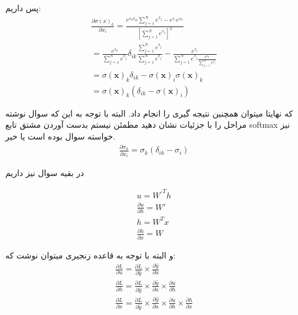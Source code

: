 \documentclass{article}[12pt]
\begin{document}
پس داریم:
\begin{gather*}
		\frac{\partial \sigma(x)_{k}}{\partial x_{i}}=\frac{e^{x_{k} \delta_{i k}} \sum_{j=1}^{N} e^{x_{j}}-e^{x_{i}} e^{x_{k}}}{\left[\sum_{j=1}^{N} e^{x_{j}}\right]^{2}} \\
		=\frac{e^{x_{k}}}{\sum_{j=1}^{N} e^{x_{j}}} \delta_{i k} \frac{\sum_{j=1}^{N} e^{x_{j}}}{\sum_{j=1}^{N} e^{x_{j}}}-\frac{e^{x_{i}}}{\sum_{j=1}^{N} e^{x_{j}} \frac{e^{x_{k}}}{\sum_{j=1}^{N} e^{x_{j}}}} \\
		=\sigma(\mathbf{x})_{k} \delta_{i k}-\sigma(\mathbf{x})_{i} \sigma(\mathbf{x})_{k} \\
		=\sigma(\mathbf{x})_{k}\left(\delta_{i k}-\sigma(\mathbf{x})_{i}\right)
\end{gather*}

که نهایتا میتوان همچنین نتیجه گیری را انجام داد. البته با توجه به این که سوال نوشته مراحل را با جزئیات نشان دهید مطمئن نیستم بدست آوردن مشتق تابع softmax نیز خواسته سوال بوده است یا خیر. 
\begin{gather*}
	\frac{\partial \sigma_{k}}{\partial x_{i}}=\sigma_{k}\left(\delta_{i k}-\sigma_{i}\right)
\end{gather*}

در بقیه سوال نیز داریم 

$$ \begin{array}{l}
	u=W{^{\prime }}^{T} h\\
	\frac{\partial u}{\partial h} =W'\\
	h=W^{T} x\\
	\frac{\partial h}{\partial x} =W
\end{array}
$$

و البته با توجه به قاعده زنجیری میتوان نوشت که: 
\begin{gather*}
	\frac{\partial L}{\partial u} =\frac{\partial L}{\partial \hat{y}} \times \frac{\partial \hat{y}}{\partial u}\\
	\frac{\partial L}{\partial h} =\frac{\partial L}{\partial \hat{y}} \times \frac{\partial \hat{y}}{\partial u} \times \frac{\partial u}{\partial h}\\
	\frac{\partial L}{\partial x} =\frac{\partial L}{\partial \hat{y}} \times \frac{\partial \hat{y}}{\partial u} \times \frac{\partial u}{\partial h} \times \frac{\partial h}{\partial x}
\end{gather*}
	


 
\end{document}
